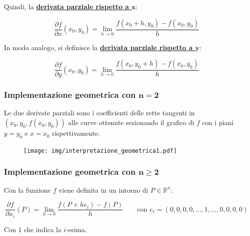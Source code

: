 \documentclass[a4paper]{article}
\begin{document}
	\noindent
	Quindi, la \textcolor{Red3}{\textbf{\underline{derivata parziale rispetto a $\boldsymbol{x}$}}}:
	
	\begin{equation*}
		\dfrac{\partial f}{\partial x} \left(x_{0}, y_{0}\right) = \lim_{h \rightarrow 0} \dfrac{f\left(x_{0} + h, y_{0}\right) - f\left(x_{0}, y_{0}\right)}{h}
	\end{equation*}

	\noindent
	In modo analogo, si definisce la \textcolor{Red3}{\textbf{\underline{derivata parziale rispetto a $\boldsymbol{y}$}}}:
	
	\begin{equation*}
		\dfrac{\partial f}{\partial y} \left(x_{0}, y_{0}\right) = \lim_{h \rightarrow 0} \dfrac{f\left(x_{0}, y_{0} + h\right) - f\left(x_{0}, y_{0}\right)}{h}
	\end{equation*}

	\newpage

	\subsubsection{Implementazione geometrica con $\boldsymbol{n = 2}$}
	
	Le due derivate parziali sono i coefficienti delle rette tangenti in $\left(x_{0}, y_{0}, f\left(x_{0}, y_{0}\right)\right)$ alle curve ottenute sezionando il grafico di $f$ con i piani $y = y_{0}$ e $x = x_{0}$ rispettivamente.
	
	\begin{figure}[!htp]
		\centering
		\texttt{[image: img/interpretazione\_geometrica1.pdf]}
	\end{figure}
	
	\subsubsection{Implementazione geometrica con $\boldsymbol{n \ge 2}$}
	
	Con la funzione $f$ viene definita in un intorno di $P \in \mathbb{R}^{n}$:
	
	\begin{equation*}
		\dfrac{\partial f}{\partial x_{i}}\left(P\right) = \lim_{h \rightarrow 0} \dfrac{f\left(P + h e_{i}\right) - f\left(P\right)}{h} \hspace{2em} \text{con } e_{i} = \left(0,0,0,0, ..., 1, ..., 0,0,0,0\right)
	\end{equation*}

	\noindent
	Con $1$ che indica la $i$-esima.
	
\end{document}
